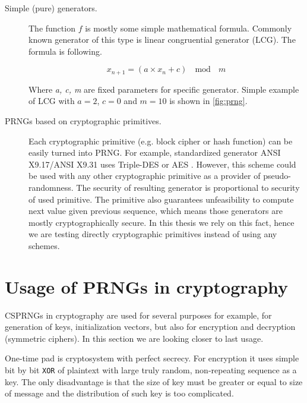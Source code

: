 \documentclass[
    digital,    %
    oneside,    %
    color,
    11pt,
    nocover,
    notable,
    nolof,
    nolot,
    final
]{fithesis3}
\renewcommand\_{\textunderscore\allowbreak}
\begin{document}
\begin{description}
	\item[Simple (pure) generators.] The function $f$ is mostly some simple mathematical formula. Commonly known generator of this type is linear congruential generator (LCG). The formula is following. \cite{LEcuyer07testu01}
	
	\begin{equation}
	x_{n+1} = \left( a \times x_n + c \right)~~\bmod~~m
	\label{formula:lcg}
	\end{equation}	
	
	Where \textit{a, c, m} are fixed parameters for specific generator. Simple example of LCG with $a = 2$, $c = 0$ and $m = 10$ is shown in \cref{fig:prng}. 
	
	\item[PRNGs based on cryptographic primitives.] Each cryptographic primitive (e.g. block cipher or hash function) can be easily turned into PRNG. For example, standardized generator ANSI X9.17/ANSI X9.31 \cite{ansi1985american} uses Triple-DES or AES \cite{Keller05nist-recommendedrandom}. However, this scheme could be used with any other cryptographic primitive as a provider of pseudo-randomness. The security of resulting generator is proportional to security of used primitive. The primitive also guarantees unfeasibility to compute next value given previous sequence, which means those generators are mostly cryptographically secure. In this thesis we rely on this fact, hence we are testing directly cryptographic primitives instead of using any schemes.

\end{description} 

\section{Usage of PRNGs in cryptography}

CSPRNGs in cryptography are used for several purposes for example, for generation of keys, initialization vectors, but also for encryption and decryption (symmetric ciphers). In this section we are looking closer to last usage.

One-time pad is cryptosystem with perfect secrecy. For encryption it uses simple bit by bit \texttt{XOR} of plaintext with large truly random, non-repeating sequence as a key. The only disadvantage is that the size of key must be greater or equal to size of message and the distribution of such key is too complicated. \cite{schneier1996applied}
\end{document}

